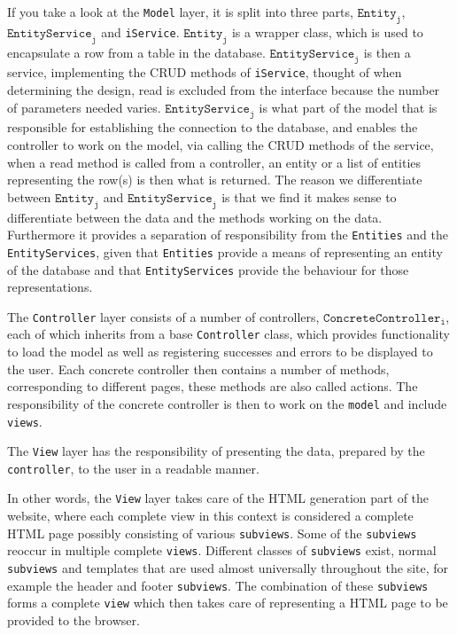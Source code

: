 \begin{description}[style=nextline]
	\item[Model Layer] 
	If you take a look at the \texttt{Model} layer, it is split into three parts, $\texttt{Entity}_\texttt{j}$, $\texttt{EntityService}_\texttt{j}$ and \texttt{iService}.
	$\texttt{Entity}_\texttt{j}$ is a wrapper class, which is used to encapsulate a row from a table in the database.
	$\texttt{EntityService}_\texttt{j}$ is then a service, implementing the CRUD methods of \texttt{iService}, thought of when determining the design, read is excluded from the interface because the number of parameters needed varies.
	$\texttt{EntityService}_\texttt{j}$ is what part of the model that is responsible for establishing the connection to the database, and enables the controller to work on the model, via calling the CRUD methods of the service, when a read method is called from a controller, an entity or a list of entities representing the row(s) is then what is returned.
	The reason we differentiate between  $\texttt{Entity}_\texttt{j}$ and $\texttt{EntityService}_\texttt{j}$ is that we find it makes sense to differentiate between the data and the methods working on the data.
    Furthermore it provides a separation of responsibility from the \texttt{Entities} and the \texttt{EntityServices}, given that \texttt{Entities} provide a means of representing an entity of the database and that \texttt{EntityServices} provide the behaviour for those representations.
	
	\item[Controller Layer]
	The \texttt{Controller} layer consists of a number of controllers, $\texttt{ConcreteController}_\texttt{i}$, each of which inherits from a base \texttt{Controller} class, which provides functionality to load the model as well as registering successes and errors to be displayed to the user.
	Each concrete controller then contains a number of methods, corresponding to different pages, these methods are also called actions. 
    The responsibility of the concrete controller is then to work on the \texttt{model} and include \texttt{views}. 
	
	\item[View Layer]
	The \texttt{View} layer has the responsibility of presenting the data, prepared by the \texttt{controller}, to the user in a readable manner.
	
	In other words, the \texttt{View} layer takes care of the HTML generation part of the website, where each complete view in this context is considered a complete HTML page possibly consisting of various \texttt{subviews}.
	Some of the \texttt{subviews} reoccur in multiple complete \texttt{views}.
    Different classes of \texttt{subviews} exist, normal \texttt{subviews} and templates that are used almost universally throughout the site, for example the header and footer \texttt{subviews}.
	The combination of these \texttt{subviews} forms a complete \texttt{view} which then takes care of representing a HTML page to be provided to the browser.
	

\end{description}
